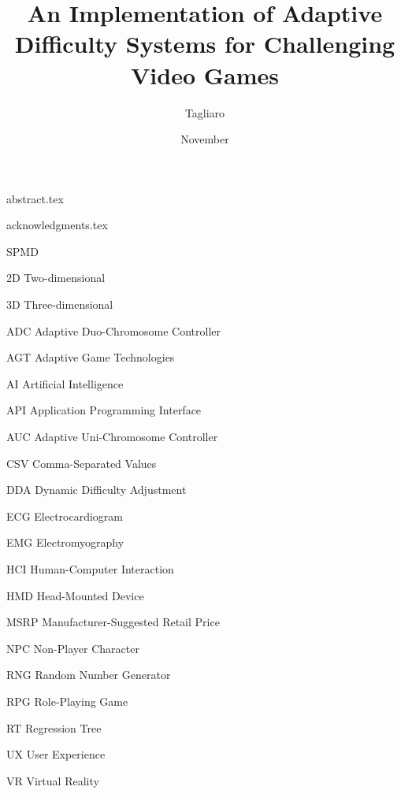 \documentclass[cic,tc,english,nominata]{resources/documentclass/iiufrgs}
\title{An Implementation of Adaptive Difficulty Systems for Challenging Video Games}
\author{Tagliaro}{Leonardo Ramos Gonzalez}
\date{November}{2021} %
\begin{document}
\maketitle


{abstract.tex}


{acknowledgments.tex}


\listoffigures     %
\listoftables      %


\begin{listofabbrv}{SPMD}
    \item[2D] Two-dimensional
    \item[3D] Three-dimensional
    \item[ADC] Adaptive Duo-Chromosome Controller
	\item[AGT] Adaptive Game Technologies
	\item[AI] Artificial Intelligence
	\item[API] Application Programming Interface
	\item[AUC] Adaptive Uni-Chromosome Controller 
	\item[CSV] Comma-Separated Values 
    \item[DDA] Dynamic Difficulty Adjustment
    \item[ECG] Electrocardiogram
    \item[EMG] Electromyography
    \item[HCI] Human-Computer Interaction
    \item[HMD] Head-Mounted Device
    \item[MSRP] Manufacturer-Suggested Retail Price 
    \item[NPC] Non-Player Character
    \item[RNG] Random Number Generator 
    \item[RPG] Role-Playing Game
    \item[RT] Regression Tree
    \item[UX] User Experience
    \item[VR] Virtual Reality
\end{listofabbrv}
\end{document}
